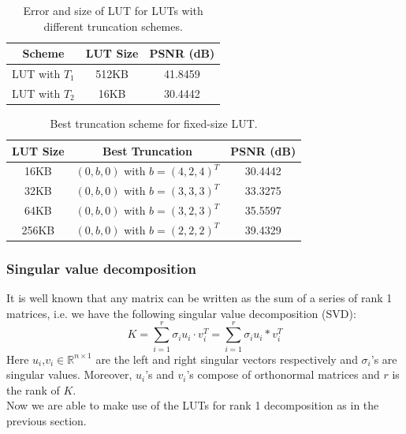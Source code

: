 \documentclass{beamer}
\begin{document}
\begin{frame}
\begin{center}
\begin{table}
	 
    \begin{tabular}{ | c | c| c |}
    \hline
    Scheme & LUT Size & PSNR (dB) \\ \hline
    LUT with $T_1$ & 512KB & 41.8459 \\ \hline
    LUT with $T_2$ & 16KB & 30.4442 \\ \hline   
    \end{tabular}
    \bigskip
    
    \caption{Error and size of LUT for LUTs with different truncation schemes.}
\end{table} \label{tbl:low_pass}
\end{center}

\begin{center}
\begin{table}
	
    \begin{tabular}{ | c | c | c | }
    \hline
    LUT Size & Best Truncation & PSNR (dB) \\ \hline
    16KB& $(0,b,0)$ with $b=(4,2,4)^T$ & 30.4442 \\ \hline
    32KB& $(0,b,0)$ with $b=(3,3,3)^T$ & 33.3275 \\ \hline 
    64KB& $(0,b,0)$ with $b=(3,2,3)^T$ & 35.5597 \\ \hline 
    256KB& $(0,b,0)$ with $b=(2,2,2)^T$ & 39.4329 \\ \hline 
    \end{tabular}
    \bigskip
    
    \caption{Best truncation scheme for fixed-size LUT.}
\end{table} \label{tbl:optimization}
\end{center}

\end{frame}

\begin{frame}
\frametitle{Singular value decomposition}
It is well known that any matrix can be written as the sum of a series of rank 1 matrices, i.e. we have the following singular value decomposition (SVD): 
\[K=\sum_{i=1}^{r}\sigma_i u_i\cdot v_i^T=\sum_{i=1}^{r}\sigma_i u_i* v_i^T\]
Here $u_i$,$v_i\in\mathbb{R}^{n\times 1}$ are the left and right singular vectors respectively and $\sigma_i$'s are singular values. Moreover, $u_i$'s and $v_i$'s compose of orthonormal matrices and $r$ is the rank of $K$. \\

Now we are able to make use of the LUTs for rank 1 decomposition as in the previous section.


\end{frame}
\end{document}
